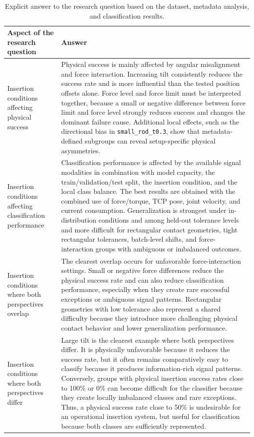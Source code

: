 \begin{table}[htbp]
\centering
\caption{Explicit answer to the research question based on the dataset, metadata analysis, and classification results.}
\label{tab:research_question_answer}
\begin{tabular}{p{}p{}}
\toprule
\textbf{Aspect of the research question} & \textbf{Answer} \\
\midrule
Insertion conditions affecting physical success &
Physical success is mainly affected by angular misalignment and force interaction. Increasing tilt consistently reduces the success rate and is more influential than the tested position offsets alone. Force level and force limit must be interpreted together, because a small or negative difference between force limit and force level strongly reduces success and changes the dominant failure cause. Additional local effects, such as the directional bias in \texttt{small\_rod\_t0.3}, show that metadata-defined subgroups can reveal setup-specific physical asymmetries. \\
\midrule
Insertion conditions affecting classification performance &
Classification performance is affected by the available signal modalities in combination with model capacity, the train/validation/test split, the insertion condition, and the local class balance. The best results are obtained with the combined use of force/torque, TCP pose, joint velocity, and current consumption. Generalization is strongest under in-distribution conditions and among held-out tolerance levels and more difficult for rectangular contact geometries, tight rectangular tolerances, batch-level shifts, and force-interaction groups with ambiguous or imbalanced outcomes. \\
\midrule
Insertion conditions where both perspectives overlap &
The clearest overlap occurs for unfavorable force-interaction settings. Small or negative force differences reduce the physical success rate and can also reduce classification performance, especially when they create rare successful exceptions or ambiguous signal patterns. Rectangular geometries with low tolerance also represent a shared difficulty because they introduce more challenging physical contact behavior and lower generalization performance. \\
\midrule
Insertion conditions where both perspectives differ &
Large tilt is the clearest example where both perspectives differ. It is physically unfavorable because it reduces the success rate, but it often remains comparatively easy to classify because it produces information-rich signal patterns. Conversely, groups with physical insertion success rates close to 100\% or 0\% can become difficult for the classifier because they create locally imbalanced classes and rare exceptions. Thus, a physical success rate close to 50\% is undesirable for an operational insertion system, but useful for classification because both classes are sufficiently represented. \\
\bottomrule
\end{tabular}
\end{table}


